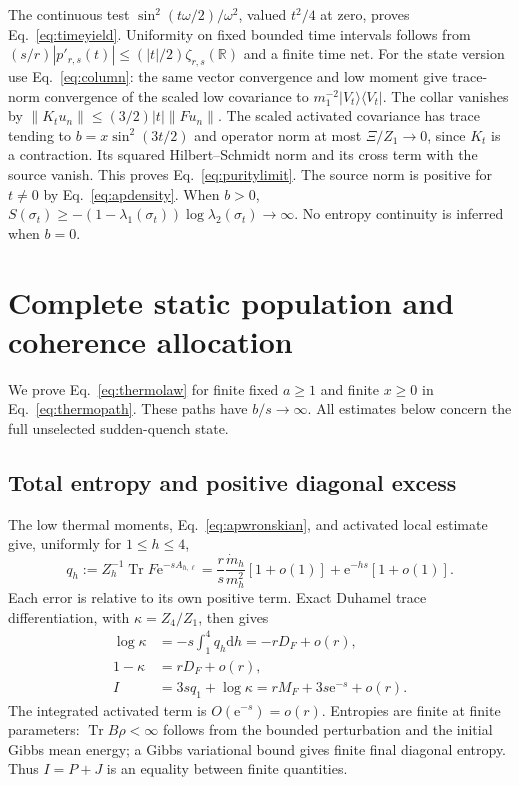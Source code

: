 \documentclass[aps,pra,reprint,superscriptaddress,longbibliography]{revtex4-2}
\newcommand{\Tr}{\operatorname{Tr}}
\newcommand{\dd}{\mathrm d}
\newcommand{\ee}{\mathrm e}
\newcommand{\norm}[1]{\left\lVert#1\right\rVert}
\newcommand{\ket}[1]{\lvert#1\rangle}
\newcommand{\bra}[1]{\langle#1\rvert}
\begin{document}
The continuous test $\sin^2(t\omega/2)/\omega^2$, valued $t^2/4$
at zero, proves Eq.~\eqref{eq:timeyield}. Uniformity on fixed bounded
time intervals follows from
$(s/r)|p'_{r,s}(t)|\le(|t|/2)\zeta_{r,s}(\mathbb R)$ and a finite
time net. For the state version use Eq.~\eqref{eq:column}: the same
vector convergence and low moment give trace-norm convergence of
the scaled low covariance to $m_1^{-2}\ket{V_t}\bra{V_t}$. The
collar vanishes by $\norm{K_tu_n}\le(3/2)|t|\norm{Fu_n}$.
The scaled activated covariance has trace tending to
$b=x\sin^2(3t/2)$ and operator norm at most $\Xi/Z_1\to0$, since
$K_t$ is a contraction. Its squared Hilbert--Schmidt norm and its
cross term with the source vanish. This proves Eq.~\eqref{eq:puritylimit}.
The source norm is positive for $t\ne0$ by Eq.~\eqref{eq:apdensity}.
When $b>0$,
$S(\sigma_t)\ge-(1-\lambda_1(\sigma_t))\log\lambda_2(\sigma_t)
\to\infty$. No entropy continuity is inferred when $b=0$.

\section{Complete static population and coherence allocation}
\label{app:entropy}

We prove Eq.~\eqref{eq:thermolaw} for finite fixed $a\ge1$ and
finite $x\ge0$ in Eq.~\eqref{eq:thermopath}. These paths have
$b/s\to\infty$. All estimates below concern the full unselected
sudden-quench state.

\subsection{Total entropy and positive diagonal excess}

The low thermal moments, Eq.~\eqref{eq:apwronskian}, and activated
local estimate give, uniformly for $1\le h\le4$,
\begin{equation}
 q_h:=Z_h^{-1}\Tr F\ee^{-sA_{h,\ell}}
 =\frac r s\frac{\dot m_h}{m_h^2}[1+o(1)]
                         +\ee^{-hs}[1+o(1)].             \label{eq:apheight}
\end{equation}
Each error is relative to its own positive term. Exact Duhamel trace
differentiation, with $\kappa=Z_4/Z_1$, then gives
\begin{align}
 \log\kappa&=-s\int_1^4q_h\dd h=-rD_F+o(r),\nonumber\\
 1-\kappa&=rD_F+o(r),\qquad\nonumber\\
 I&=3sq_1+\log\kappa=rM_F+3s\ee^{-s}+o(r).                \label{eq:aptotalentropy}
\end{align}
The integrated activated term is $O(\ee^{-s})=o(r)$. Entropies are
finite at finite parameters: $\Tr B\rho<\infty$ follows from the
bounded perturbation and the initial Gibbs mean energy; a Gibbs
variational bound gives finite final diagonal entropy. Thus $I=P+J$
is an equality between finite quantities.
\end{document}
